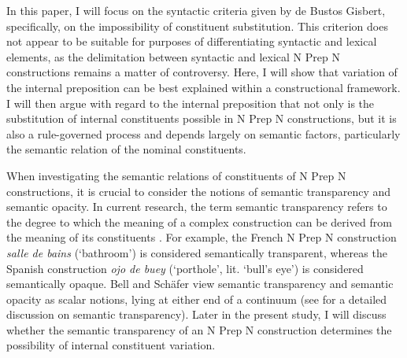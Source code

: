 \documentclass[output=paper]{langsci/langscibook}
\begin{document}
In this paper, I will focus on the syntactic criteria given by de Bustos Gisbert, specifically, on the impossibility of constituent substitution. This criterion does not appear to be suitable for purposes of differentiating syntactic and lexical elements, as the delimitation between syntactic and lexical N Prep N constructions remains a matter of controversy. Here, I will show that variation of the internal preposition can be best explained within a constructional framework. I will then argue with regard to the internal preposition that not only is the substitution of internal constituents possible in N Prep N constructions, but it is also a rule-governed process and depends largely on semantic factors, particularly the semantic relation of the nominal constituents.

When investigating the semantic relations of constituents of N Prep N constructions, it is crucial to consider the notions of semantic transparency and semantic opacity. In current research, the term semantic transparency refers to the degree to which the meaning of a complex construction can be derived from the meaning of its constituents \citep{Zwitserlood:1994}. For example, the French N Prep N construction \textit{salle de bains} (`bathroom') is considered semantically transparent, whereas the Spanish construction \textit{ojo de buey} (`porthole', lit. `bull's eye') is considered semantically opaque. Bell and Schäfer view semantic transparency and semantic opacity as scalar notions, lying at either end of a continuum (see \citet{Bell:2016} for a detailed discussion on semantic transparency). Later in the present study, I will discuss whether the semantic transparency of an N Prep N construction determines the possibility of internal constituent variation.
\end{document}
